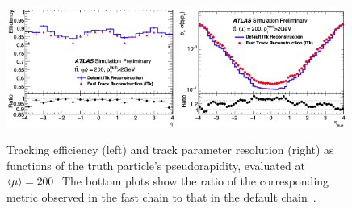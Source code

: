 \begin{figure}[t]
    \centering
    \includegraphics[width=0.49\textwidth]{figures/eff-fast-def.png}
    \includegraphics[width=0.49\textwidth]{figures/res-fast-def.png}
    \caption{Tracking efficiency (left) and track parameter resolution (right) as functions of the truth particle's pseudorapidity, evaluated at $\expval{\mu}=200$. The bottom plots show the ratio of the corresponding metric observed in the fast chain to that in the default chain~\cite{ATL-PHYS-PUB-2019-041}.}
    \label{fig:fast-default-phys}
\end{figure}

